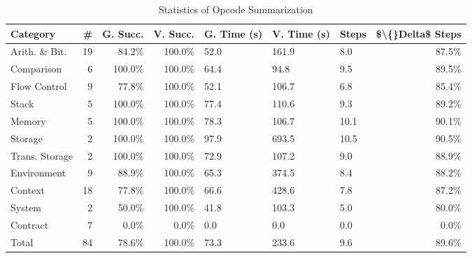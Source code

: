 \begin{table}[htbp]
\centering
\caption{Statistics of Opcode Summarization}
\label{tab:step3_category_statistics}
\begin{tabular}{lrrrlllr}
\toprule
Category & \# & G. Succ. & V. Succ. & G. Time (s) & V. Time (s) & Steps & \$\textbackslash\{\}Delta\$ Steps \\
\midrule
Arith. \& Bit. & 19 & 84.2\% & 100.0\% & 52.0 & 161.9 & 8.0 & 87.5\% \\
Comparison & 6 & 100.0\% & 100.0\% & 64.4 & 94.8 & 9.5 & 89.5\% \\
Flow Control & 9 & 77.8\% & 100.0\% & 52.1 & 106.7 & 6.8 & 85.4\% \\
Stack & 5 & 100.0\% & 100.0\% & 77.4 & 110.6 & 9.3 & 89.2\% \\
Memory & 5 & 100.0\% & 100.0\% & 78.3 & 106.7 & 10.1 & 90.1\% \\
Storage & 2 & 100.0\% & 100.0\% & 97.9 & 693.5 & 10.5 & 90.5\% \\
Trans. Storage & 2 & 100.0\% & 100.0\% & 72.9 & 107.2 & 9.0 & 88.9\% \\
Environment & 9 & 88.9\% & 100.0\% & 65.3 & 374.5 & 8.4 & 88.2\% \\
Context & 18 & 77.8\% & 100.0\% & 66.6 & 428.6 & 7.8 & 87.2\% \\
System & 2 & 50.0\% & 100.0\% & 41.8 & 103.3 & 5.0 & 80.0\% \\
Contract & 7 & 0.0\% & 0.0\% & 0.0 & 0.0 & 0.0 & 0.0\% \\
Total & 84 & 78.6\% & 100.0\% & 73.3 & 233.6 & 9.6 & 89.6\% \\
\bottomrule
\end{tabular}
\end{table}